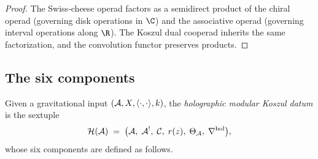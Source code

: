 \begin{proof}
The Swiss-cheese operad factors as a semidirect product of the
chiral operad (governing disk operations in $\C$) and the
associative operad (governing interval operations along $\R$).
The Koszul dual cooperad inherits the same factorization, and the
convolution functor preserves products.
\end{proof}


\subsection{The six components}

\begin{definition}
Given a gravitational input $(\mathcal{A}, X, \langle\cdot,\cdot\rangle, k)$, the
\emph{holographic modular Koszul datum} is the sextuple
\begin{equation}%
\mathcal{H}(\cA) \;=\; \bigl(\cA,\;\cA^!,\;\mathcal{C},\;r(z),\;
\Theta_\cA,\;\nabla^{\mathrm{hol}}\bigr),
\end{equation}
whose six components are defined as follows.
\end{definition}

